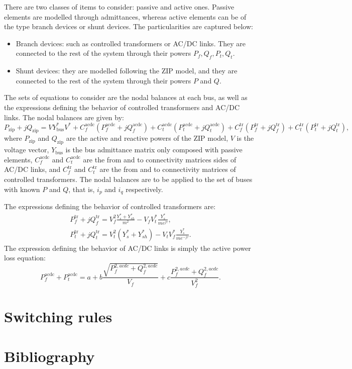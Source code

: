 \documentclass[11pt]{article}
\begin{document}
There are two classes of items to consider: passive and active ones. Passive elements are modelled through admittances, whereas active elements can be of the type branch devices or shunt devices. The particularities are captured below:
\begin{itemize}
	\item Branch devices: such as controlled transformers or AC/DC links. They are connected to the rest of the system through their powers $P_f, Q_f, P_t, Q_t$. 
	\item Shunt devices: they are modelled following the ZIP model, and they are connected to the rest of the system through their powers $P$ and $Q$.
\end{itemize}
The sets of equations to consider are the nodal balances at each bus, as well as the expressions defining the behavior of controlled transformers and AC/DC links. The nodal balances are given by:
\begin{equation}
	P_\text{zip}+jQ_\text{zip} = VY^*_\text{bus}V^* + C_f^\text{acdc}(P^\text{acdc}_f + jQ^\text{acdc}_f) + C_t^\text{acdc}(P^\text{acdc}_t + jQ^\text{acdc}_t) + C_f^\text{tr}(P^\text{tr}_f + jQ^\text{tr}_f) + C_t^\text{tr}(P^\text{tr}_t + jQ^\text{tr}_t),
\end{equation}
where $P_\text{zip}$ and $Q_\text{zip}$ are the active and reactive powers of the ZIP model, $V$ is the voltage vector, $Y_\text{bus}$ is the bus admittance matrix only composed with passive elements, $C_f^\text{acdc}$ and $C_t^\text{acdc}$ are the from and to connectivity matrices sides of AC/DC links, and $C_f^\text{tr}$ and $C_t^\text{tr}$ are the from and to connectivity matrices of controlled transformers. The nodal balances are to be applied to the set of buses with known $P$ and $Q$, that is, ${i}_p$ and ${i}_q$ respectively.

The expressions defining the behavior of controlled transformers are:
\begin{equation}
	\begin{aligned}
		P_f^\text{tr} + jQ_f^\text{tr} = V_f^2 \frac{Y_s^* + Y_{sh}^*}{m^2} - V_fV_t^*\frac{Y_s^*}{me^{j\tau}}, \\
		P_t^\text{tr} + jQ_t^\text{tr} = V_t^2 (Y_s^* + Y_{sh}^*) - V_tV_f^*\frac{Y_s^*}{me^{-j\tau}}.
	\end{aligned}
\end{equation}
The expression defining the behavior of AC/DC links is simply the active power loss equation:
\begin{equation}
	P_f^\text{acdc} + P_t^\text{acdc} = a + b\frac{\sqrt{P_f^{2,acdc} + Q_f^{2,acdc}}}{V_f} + c\frac{P_f^{2,acdc} + Q_f^{2,acdc}}{V_f^2}.	
\end{equation}


\section{Switching rules}

	
	
\section{Bibliography}
	\printbibliography
	
\end{document}
